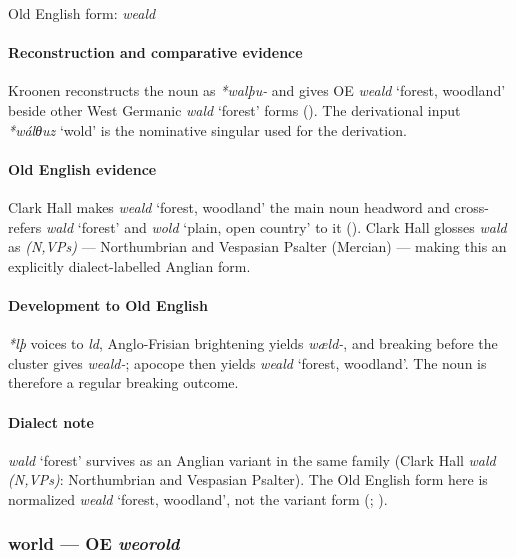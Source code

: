 \documentclass[
  british,
  a4paper,
]{article}
\providecommand{\Recon}[1]{\emph{*#1}}
\begin{document}
Old English form: \emph{weald}

\paragraph{Reconstruction and comparative
evidence}\label{reconstruction-and-comparative-evidence-81}

Kroonen reconstructs the noun as \emph{*walþu-} and gives OE
{\emph{weald}} `forest, woodland' beside other West Germanic
{\emph{wald}} `forest' forms ().
The derivational input \Recon{wálθuz} `wold' is the nominative singular
used for the derivation.

\paragraph{Old English evidence}\label{old-english-evidence-83}

Clark Hall makes {\emph{weald}} `forest, woodland' the main noun
headword and cross-refers {\emph{wald}} `forest' and {\emph{wold}}
`plain, open country' to it (). Clark Hall glosses \emph{wald} as \emph{(N,VPs)} ---
Northumbrian and Vespasian Psalter (Mercian) --- making this an
explicitly dialect-labelled Anglian form.

\paragraph{Development to Old
English}\label{development-to-old-english-82}

\emph{*lþ} voices to \emph{ld}, Anglo-Frisian brightening yields
\emph{wæld-}, and breaking before the cluster gives \emph{weald-};
apocope then yields {\emph{weald}} `forest, woodland'. The noun is
therefore a regular breaking outcome.

\paragraph{Dialect note}\label{dialect-note-6}

{\emph{wald}} `forest' survives as an Anglian variant in the same family
(Clark Hall \emph{wald (N,VPs)}: Northumbrian and Vespasian Psalter).
The Old English form here is normalized {\emph{weald}} `forest,
woodland', not the variant form (; ).

\subsubsection{\texorpdfstring{world --- OE
\emph{weorold}}{world --- OE weorold}}\label{world-oe-weorold}
\end{document}
